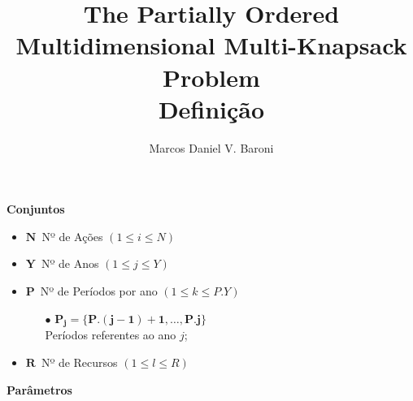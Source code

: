 \documentclass{article}
\title{The Partially Ordered Multidimensional Multi-Knapsack Problem \\ {Definição} }
\author{Marcos Daniel V. Baroni}
\newcommand{\topico}[1]{
  \vspace{20pt}
  {\Large \bf #1 }
}
\newcommand{\variavel}[1]{
  { \Large $ \bm{ #1 } \, $}
}
\begin{document}
\maketitle

\topico{Conjuntos}

\begin{itemize}
  \item \variavel{N} Nº de Ações {\scriptsize $(1 \leq i \leq N) $}
  \item \variavel{Y} Nº de Anos  {\scriptsize $(1 \leq j \leq Y) $}
  \item \variavel{P} Nº de Períodos por ano {\scriptsize $(1 \leq k \leq P.Y)$}
    \begin{itemize}
	  \item[$\bullet$]{\small $\bm{P_{j} = \{P.(j-1)+1, \ldots, P.j\}}$ \\ Períodos referentes ao ano $j$;} 
	\end{itemize}
  \item \variavel{R} Nº de Recursos {\scriptsize $(1 \leq l \leq R)$}
\end{itemize}

\topico{Parâmetros}
\end{document}
